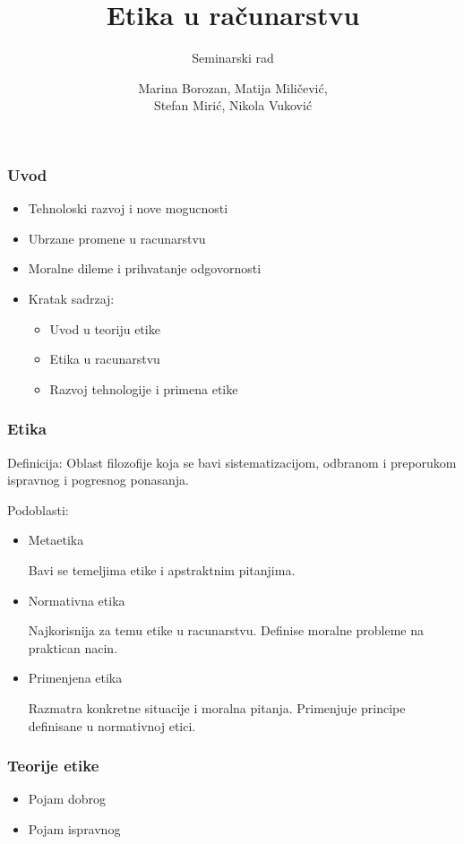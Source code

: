 \documentclass[pdf]{beamer}
\title{Etika u računarstvu}
\subtitle{Seminarski rad}%
\author{Marina Borozan, Matija Miličević,\\
	Stefan Mirić, Nikola Vuković\\}
\begin{document}
\begin{frame}
	\titlepage	
	\end{frame}


\begin{frame}
\frametitle{Uvod}

\begin{itemize}
\item{Tehnoloski razvoj i nove mogucnosti}
\item{Ubrzane promene u racunarstvu}
\item{Moralne dileme i prihvatanje odgovornosti}
\item{Kratak sadrzaj:}
	\begin{itemize}
	\item{Uvod u teoriju etike}
	\item{Etika u racunarstvu}
	\item{Razvoj tehnologije i primena etike}
	\end{itemize}
\end{itemize}

\end{frame}

\begin{frame}
\frametitle{Etika}

Definicija: Oblast filozofije koja se bavi sistematizacijom, odbranom i preporukom ispravnog i pogresnog ponasanja.

Podoblasti:
\begin{itemize}
\item{Metaetika

	Bavi se temeljima etike i apstraktnim pitanjima.}
\item{Normativna etika

	Najkorisnija za temu etike u racunarstvu. Definise moralne probleme na praktican nacin.}
\item{Primenjena etika
	
	Razmatra konkretne situacije i moralna pitanja. Primenjuje principe definisane u normativnoj etici.}
\end{itemize}

\end{frame}

\begin{frame}
\frametitle{Teorije etike}

\begin{itemize}
\item{Pojam dobrog}
\item{Pojam ispravnog}
\end{itemize}


\end{frame}
\end{document}
